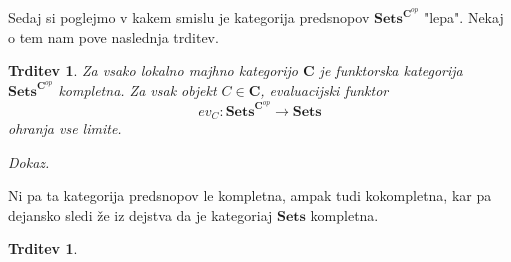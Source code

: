 \documentclass[12pt,a4paper]{book}
\theoremstyle{definition}
\theoremstyle{plain}
\newtheorem{trditev}[definicija]{Trditev}
\newenvironment{dokaz}{\emph{Dokaz.}\ }{\hspace{\fill}{$\Box$}}
\theoremstyle{definition}
\theoremstyle{remark}
\newcommand{\cat}[1]{\textbf{#1}}
\newcommand{\predsnop}[1]{\cat{Sets}^{\cat{#1}^{op}}}
\begin{document}
Sedaj si poglejmo v kakem smislu je kategorija predsnopov $\predsnop{C}$ "lepa". Nekaj o tem nam pove naslednja trditev.

\begin{trditev}
Za vsako lokalno majhno kategorijo $\cat{C}$ je funktorska kategorija $\predsnop{C}$ kompletna. Za vsak objekt $C \in \cat{C}$, evaluacijski funktor 
$$ev_C : \predsnop{C} \to \cat{Sets}$$
ohranja vse limite.
\end{trditev}
\begin{dokaz}

\end{dokaz}

Ni pa ta kategorija predsnopov le kompletna, ampak tudi kokompletna, kar pa dejansko sledi že iz dejstva da je kategoriaj $\cat{Sets}$ kompletna.

\begin{trditev}

\end{trditev}
\end{document}
